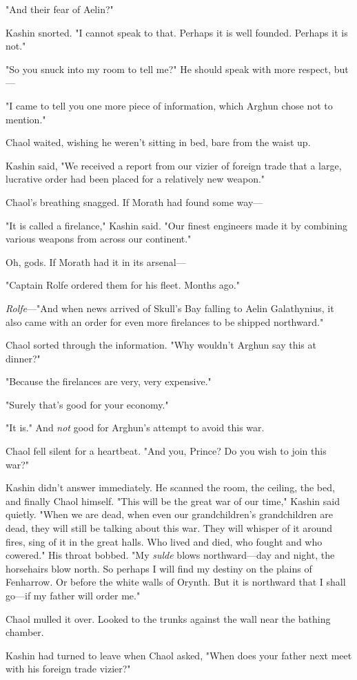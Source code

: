 "And their fear of Aelin?"

Kashin snorted.
"I cannot speak to that.
Perhaps it is well founded.
Perhaps it is not."

"So you snuck into my room to tell me?"
He should speak with more respect, but---

"I came to tell you one more piece of information, which Arghun chose not to mention."

Chaol waited, wishing he weren't sitting in bed, bare from the waist up.

Kashin said, "We received a report from our vizier of foreign trade that a large, lucrative order had been placed for a relatively new weapon."

Chaol's breathing snagged.
If Morath had found some way---

"It is called a firelance," Kashin said.
"Our finest engineers made it by combining various weapons from across our continent."

Oh, gods.
If Morath had it in its arsenal---

"Captain Rolfe ordered them for his fleet.
Months ago."

\emph{Rolfe}---"And when news arrived of Skull's Bay falling to Aelin Galathynius, it also came with an order for even more firelances to be shipped northward."

Chaol sorted through the information.
"Why wouldn't Arghun say this at dinner?"

"Because the firelances are very, very expensive."

"Surely that's good for your economy."

"It is."
And \emph{not} good for Arghun's attempt to avoid this war.

Chaol fell silent for a heartbeat.
"And you, Prince?
Do you wish to join this war?"

Kashin didn't answer immediately.
He scanned the room, the ceiling, the bed, and finally Chaol himself.
"This will be the great war of our time," Kashin said quietly.
"When we are dead, when even our grandchildren's grandchildren are dead, they will still be talking about this war.
They will whisper of it around fires, sing of it in the great halls.
Who lived and died, who fought and who cowered."
His throat bobbed.
"My \emph{sulde} blows northward---day and night, the horsehairs blow north.
So perhaps I will find my destiny on the plains of Fenharrow.
Or before the white walls of Orynth.
But it is northward that I shall go---if my father will order me."

Chaol mulled it over.
Looked to the trunks against the wall near the bathing chamber.

Kashin had turned to leave when Chaol asked, "When does your father next meet with his foreign trade vizier?"

